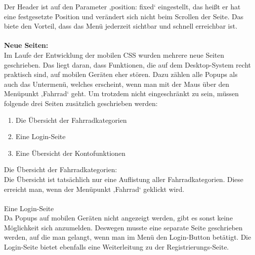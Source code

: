 Der Header ist auf den Parameter ‚position: fixed‘ eingestellt, das heißt er hat eine festgesetzte Position und verändert sich nicht beim Scrollen der Seite. Das biete den Vorteil, dass das Menü jederzeit sichtbar und schnell erreichbar ist.
\\ \\
\textbf{Neue Seiten:}
\\
Im Laufe der Entwicklung der mobilen CSS wurden mehrere neue Seiten geschrieben. Das liegt daran, dass Funktionen, die auf dem Desktop-System recht praktisch sind, auf mobilen Geräten eher stören. Dazu zählen alle Popups als auch das Untermenü, welches erscheint, wenn man mit der Maus über den Menüpunkt ‚Fahrrad‘ geht. Um trotzdem nicht eingeschränkt zu sein, müssen folgende drei Seiten zusätzlich geschrieben werden:
\begin{enumerate}
\item Die Übersicht der Fahrradkategorien 
\item Eine Login-Seite
\item Eine Übersicht der Kontofunktionen
\end{enumerate}
Die Übersicht der Fahrradkategorien:
\\
Die Übersicht ist tatsächlich nur eine Auflistung aller Fahrradkategorien. Diese erreicht man, wenn der Menüpunkt ‚Fahrrad‘ geklickt wird. 
\\ \\
Eine Login-Seite
\\
Da Popups auf mobilen Geräten nicht angezeigt werden, gibt es sonst keine Möglichkeit sich anzumelden. Deswegen musste eine separate Seite geschrieben werden, auf die man gelangt, wenn man im Menü den Login-Button betätigt. Die Login-Seite bietet ebenfalls eine Weiterleitung zu der Registrierungs-Seite.

